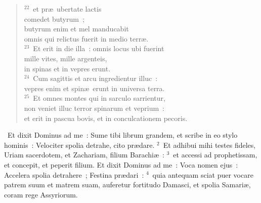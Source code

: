 \begin{flushleft}
\begin{verse}
${}^{22}$~et pr\ae\ ubertate lactis\\ comedet butyrum~;\\ butyrum enim et mel manducabit\\ omnis qui relictus fuerit in medio terr\ae .\\
${}^{23}$~Et erit in die illa~: omnis locus ubi fuerint\\ mille vites, mille argenteis,\\ in spinas et in vepres erunt.\\
${}^{24}$~Cum sagittis et arcu ingredientur illuc~:\\ vepres enim et spin\ae\ erunt in universa terra.\\
${}^{25}$~Et omnes montes qui in sarculo sarrientur,\\ non veniet illuc terror spinarum et veprium~:\\ et erit in pascua bovis, et in conculcationem pecoris.\end{verse}\end{flushleft}


~\lettrine[lines=10,image=true,loversize=0.05,lraise=-0.03]{E}{}t dixit Dominus ad me~: Sume tibi librum grandem, et scribe in eo stylo hominis~: Velociter spolia detrahe, cito pr\ae dare.
${}^{2}$~Et adhibui mihi testes fideles, Uriam sacerdotem, et Zachariam, filium Barachi\ae~:
${}^{3}$~et accessi ad prophetissam, et concepit, et peperit filium. Et dixit Dominus ad me~: Voca nomen ejus~: Accelera spolia detrahere~; Festina pr\ae dari~:
${}^{4}$~quia antequam sciat puer vocare patrem suum et matrem suam, auferetur fortitudo Damasci, et spolia Samari\ae , coram rege Assyriorum.


